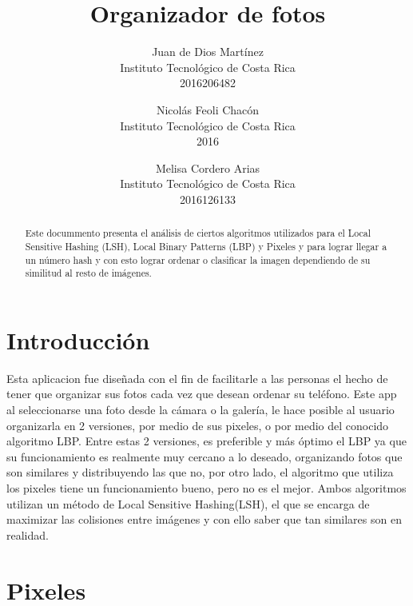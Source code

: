 \documentclass[12pt,twocolumn,letterpaper]{article}
\begin{document}
\title{Organizador de fotos}

\author{Juan de Dios Mart\'inez \\
Instituto Tecnol\'ogico de Costa Rica\\
2016206482\\
\and
Nicol\'as Feoli Chac\'on\\
Instituto Tecnol\'ogico de Costa Rica\\
2016\\
\and
Melisa Cordero Arias\\
Instituto Tecnol\'ogico de Costa Rica\\
2016126133\\
}

\maketitle

\begin{abstract}
Este docummento presenta el an\'alisis de ciertos algoritmos utilizados para el Local Sensitive Hashing (LSH), Local Binary Patterns (LBP) y Pixeles y para lograr llegar a un n\'umero hash y con esto lograr ordenar o clasificar la imagen dependiendo de su similitud al resto de im\'agenes.

\end{abstract}
\section{Introducci\'on}
Esta aplicacion fue dise\~nada con el fin de facilitarle a las personas el hecho de tener que organizar sus fotos cada vez que desean ordenar su tel\'efono. Este app al seleccionarse una foto desde la c\'amara o la galer\'ia, le hace posible al usuario organizarla en 2 versiones, por medio de sus pixeles, o por medio del conocido algoritmo LBP.
Entre estas 2 versiones, es preferible y m\'as \'optimo el LBP ya que su funcionamiento es realmente muy cercano a lo deseado, organizando fotos que son similares y distribuyendo las que no, por otro lado, el algoritmo que utiliza los pixeles tiene un funcionamiento bueno, pero no es el mejor.
Ambos algoritmos utilizan un m\'etodo de Local Sensitive Hashing(LSH), el que se encarga de maximizar las colisiones entre im\'agenes y con ello saber que tan similares son en realidad.

\section{Pixeles}
\end{document}
